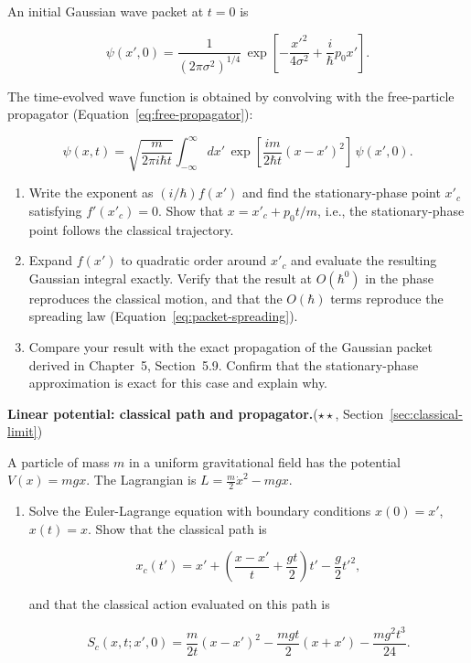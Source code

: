 \begin{problemset}
An initial Gaussian wave packet at $t=0$ is
\begin{linenomath}
\begin{equation}
\psi(x',0) = \frac{1}{(2\pi\sigma^2)^{1/4}}\,
\exp\left[-\frac{x'^2}{4\sigma^2} + \frac{i}{\hbar}p_0 x'\right].
\end{equation}
\end{linenomath}
The time-evolved wave function is obtained by convolving with the free-particle propagator (Equation~\eqref{eq:free-propagator}):
\begin{linenomath}
\begin{equation}
\psi(x,t) = \sqrt{\frac{m}{2\pi i\hbar t}}\int_{-\infty}^{\infty} dx'\,
\exp\left[\frac{im}{2\hbar t}(x-x')^2\right]\,\psi(x',0).
\end{equation}
\end{linenomath}

\begin{enumerate}
\item[(a)] Write the exponent as $(i/\hbar)f(x')$ and find the stationary-phase point $x'_c$ satisfying $f'(x'_c) = 0$. Show that $x = x'_c + p_0 t/m$, i.e., the stationary-phase point follows the classical trajectory.
\item[(b)] Expand $f(x')$ to quadratic order around $x'_c$ and evaluate the resulting Gaussian integral exactly. Verify that the result at $O(\hbar^0)$ in the phase reproduces the classical motion, and that the $O(\hbar)$ terms reproduce the spreading law (Equation~\eqref{eq:packet-spreading}).
\item[(c)] Compare your result with the exact propagation of the Gaussian packet derived in Chapter~5, Section~5.9. Confirm that the stationary-phase approximation is exact for this case and explain why.
\end{enumerate}

\item[4.] \textbf{Linear potential: classical path and propagator.}\quad($\star\star$, Section~\ref{sec:classical-limit})

A particle of mass $m$ in a uniform gravitational field has the potential $V(x) = mgx$. The Lagrangian is $L = \frac{m}{2}\dot{x}^2 - mgx$.

\begin{enumerate}
\item[(a)] Solve the Euler-Lagrange equation with boundary conditions $x(0)=x'$, $x(t)=x$. Show that the classical path is
\begin{linenomath}
\begin{equation}
x_c(t') = x' + \left(\frac{x-x'}{t} + \frac{gt}{2}\right)t' - \frac{g}{2}t'^2,
\end{equation}
\end{linenomath}
and that the classical action evaluated on this path is
\begin{linenomath}
\begin{equation}
S_c(x,t;x',0) = \frac{m}{2t}(x-x')^2 - \frac{mgt}{2}(x+x') - \frac{mg^2 t^3}{24}.
\end{equation}
\end{linenomath}


\end{enumerate}
\end{problemset}
